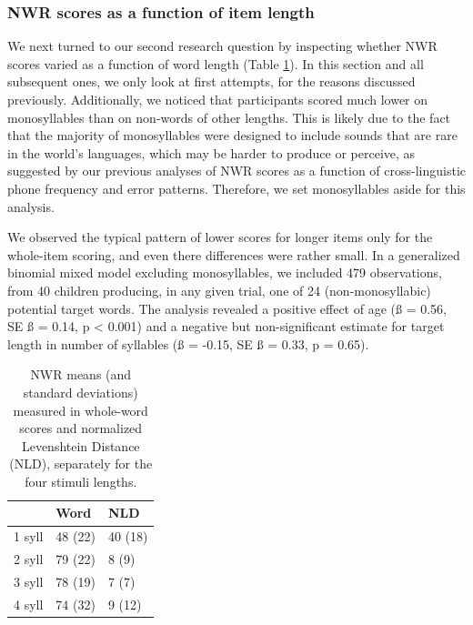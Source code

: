\documentclass[english,,man,floatsintext]{apa6} %
\providecommand{\DIFaddbegin}{} %
\providecommand{\DIFaddend}{} %
\providecommand{\DIFdelbegin}{} %
\providecommand{\DIFdelend}{} %
\newcommand{\DIFscaledelfig}{0.5}
\newlength{\DIFdelgraphicswidth} %
\newlength{\DIFdelgraphicsheight} %
\newcommand{\DIFaddincludegraphics}[2][]{{\color{blue}\fbox{\DIFOincludegraphics[#1]{#2}}}} %
\newcommand{\DIFdelincludegraphics}[2][]{%
	\sbox{\DIFdelgraphicsbox}{\DIFOincludegraphics[#1]{#2}}%
	\settoboxwidth{\DIFdelgraphicswidth}{\DIFdelgraphicsbox} %
	\settoboxtotalheight{\DIFdelgraphicsheight}{\DIFdelgraphicsbox} %
	\scalebox{\DIFscaledelfig}{%
		\parbox[b]{\DIFdelgraphicswidth}{\usebox{\DIFdelgraphicsbox}\\[-\baselineskip] \rule{\DIFdelgraphicswidth}{0em}}\llap{\resizebox{\DIFdelgraphicswidth}{\DIFdelgraphicsheight}{%
				\setlength{\unitlength}{\DIFdelgraphicswidth}%
				\begin{picture}(1,1)%
				\thicklines\linethickness{2pt} %
				{\color[rgb]{1,0,0}\put(0,0){\framebox(1,1){}}}%
				{\color[rgb]{1,0,0}\put(0,0){\line( 1,1){1}}}%
				{\color[rgb]{1,0,0}\put(0,1){\line(1,-1){1}}}%
				\end{picture}%
			}\hspace*{3pt}}} %
} %
\DeclareRobustCommand{\DIFaddbegin}{\DIFOaddbegin \let\includegraphics\DIFaddincludegraphics} %
\DeclareRobustCommand{\DIFaddend}{\DIFOaddend \let\includegraphics\DIFOincludegraphics} %
\DeclareRobustCommand{\DIFdelbegin}{\DIFOdelbegin \let\includegraphics\DIFdelincludegraphics} %
\DeclareRobustCommand{\DIFdelend}{\DIFOaddend \let\includegraphics\DIFOincludegraphics} %
\begin{document}
\DIFdelbegin %
\DIFdelend \DIFaddbegin \hypertarget{nwr-scores-as-a-function-of-item-length}{%
	\subsubsection{NWR scores as a function of item length}\label{nwr-scores-as-a-function-of-item-length}}
\DIFaddend 

We next turned to our second research question by inspecting whether NWR scores varied as a function of word length (Table \ref{tab:tablength}). In this section and all subsequent ones, we only look at first attempts, for the reasons discussed previously. Additionally, we noticed that participants scored much lower on monosyllables than on non-words of other lengths. This is likely due to the fact that the majority of monosyllables were designed to include sounds that are rare in the world's languages, which may be harder to produce or perceive, as suggested by our previous analyses of NWR scores as a function of cross-linguistic phone frequency and error patterns. Therefore, we set monosyllables aside for this analysis.

We observed the typical pattern of lower scores for longer items only for the whole-item scoring, and even there differences were rather small. In a generalized binomial mixed model excluding monosyllables, we included 479 observations, from 40 children producing, in any given trial, one of 24 (non-monosyllabic) potential target words. The analysis revealed a positive effect of age (ß = 0.56, SE ß = 0.14, p \textless{} 0.001) and a negative but non-significant estimate for target length in number of syllables (ß = -0.15, SE ß = 0.33, p = 0.65).

\begin{table}
	
	\caption{\label{tab:tablength}NWR means (and standard deviations) measured in whole-word scores and normalized Levenshtein Distance (NLD), separately for the four stimuli lengths.}
	\centering
	\begin{tabular}[t]{lll}
		\toprule
		& Word & NLD\\
		\midrule
		1 syll & 48 (22) & 40 (18)\\
		2 syll & 79 (22) & 8 (9)\\
		3 syll & 78 (19) & 7 (7)\\
		4 syll & 74 (32) & 9 (12)\\
		\bottomrule
	\end{tabular}
\end{table}
\end{document}
